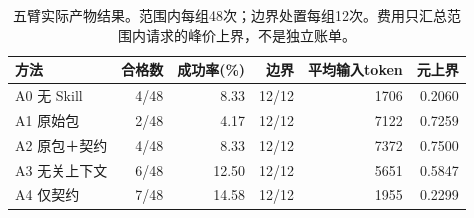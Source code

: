 \begin{table}[t]
\caption{五臂实际产物结果。范围内每组48次；边界处置每组12次。费用只汇总范围内请求的峰价上界，不是独立账单。}\label{tab:execution}
\centering\small
\begin{tabularx}{\textwidth}{Xrrrrr}
\toprule
方法 & 合格数 & 成功率(\%) & 边界 & 平均输入token & 元上界 \\
\midrule
A0 无 Skill & 4/48 & 8.33 & 12/12 & 1706 & 0.2060 \\
A1 原始包 & 2/48 & 4.17 & 12/12 & 7122 & 0.7259 \\
A2 原包＋契约 & 4/48 & 8.33 & 12/12 & 7372 & 0.7500 \\
A3 无关上下文 & 6/48 & 12.50 & 12/12 & 5651 & 0.5847 \\
A4 仅契约 & 7/48 & 14.58 & 12/12 & 1955 & 0.2299 \\
\bottomrule
\end{tabularx}
\end{table}
